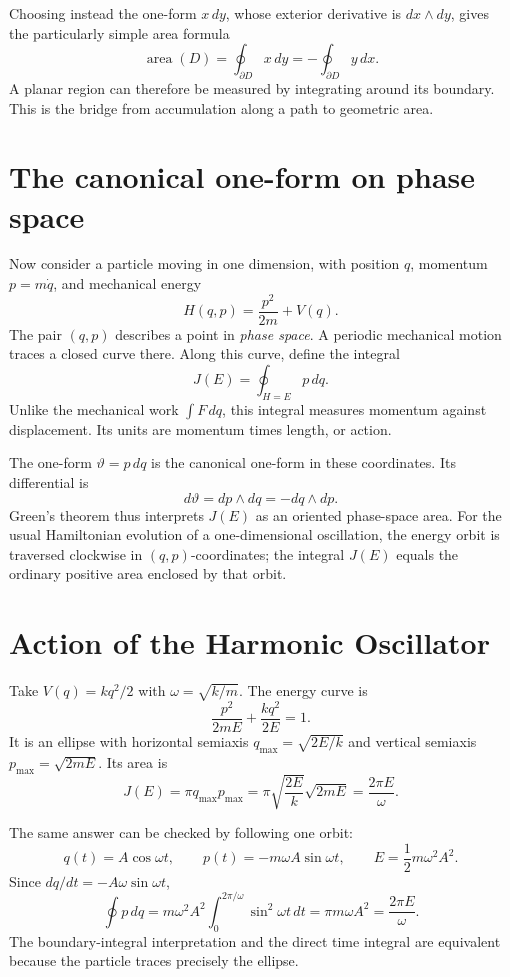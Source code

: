 Choosing instead the one-form \(x\,dy\), whose exterior derivative is \(dx\wedge dy\), gives the particularly simple area formula
\[
 \boxed{\operatorname{area}(D)=\oint_{\partial D}x\,dy
       =-\oint_{\partial D}y\,dx.}
\]
A planar region can therefore be measured by integrating around its boundary. This is the bridge from accumulation along a path to geometric area.

\section{The canonical one-form on phase space}

Now consider a particle moving in one dimension, with position \(q\), momentum \(p=m\dot q\), and mechanical energy
\[
 H(q,p)=\frac{p^2}{2m}+V(q).
\]
The pair \((q,p)\) describes a point in \emph{phase space}. A periodic mechanical motion traces a closed curve there. Along this curve, define the integral
\[
 \boxed{J(E)=\oint_{H=E}p\,dq.}
\]
Unlike the mechanical work \(\int F\,dq\), this integral measures momentum against displacement. Its units are momentum times length, or action.

The one-form \(\vartheta=p\,dq\) is the canonical one-form in these coordinates. Its differential is
\[
 d\vartheta=dp\wedge dq=-dq\wedge dp.
\]
Green's theorem thus interprets \(J(E)\) as an oriented phase-space area. For the usual Hamiltonian evolution of a one-dimensional oscillation, the energy orbit is traversed clockwise in \((q,p)\)-coordinates; the integral \(J(E)\) equals the ordinary positive area enclosed by that orbit.

\section{Action of the Harmonic Oscillator}

Take \(V(q)=kq^2/2\) with \(\omega=\sqrt{k/m}\). The energy curve is
\[
 \frac{p^2}{2mE}+\frac{kq^2}{2E}=1.
\]
It is an ellipse with horizontal semiaxis
\(q_{\max}=\sqrt{2E/k}\) and vertical semiaxis
\(p_{\max}=\sqrt{2mE}\). Its area is
\[
 J(E)=\pi q_{\max}p_{\max}
     =\pi\sqrt{\frac{2E}{k}}\sqrt{2mE}
     =\boxed{\frac{2\pi E}{\omega}}.
\]

The same answer can be checked by following one orbit:
\[
 q(t)=A\cos\omega t,\qquad
 p(t)=-m\omega A\sin\omega t,
 \qquad E=\frac12m\omega^2A^2.
\]
Since \(dq/dt=-A\omega\sin\omega t\),
\[
 \oint p\,dq
 =m\omega^2A^2\int_0^{2\pi/\omega}\sin^2\omega t\,dt
 =\pi m\omega A^2=\frac{2\pi E}{\omega}.
\]
The boundary-integral interpretation and the direct time integral are equivalent because the particle traces precisely the ellipse.

